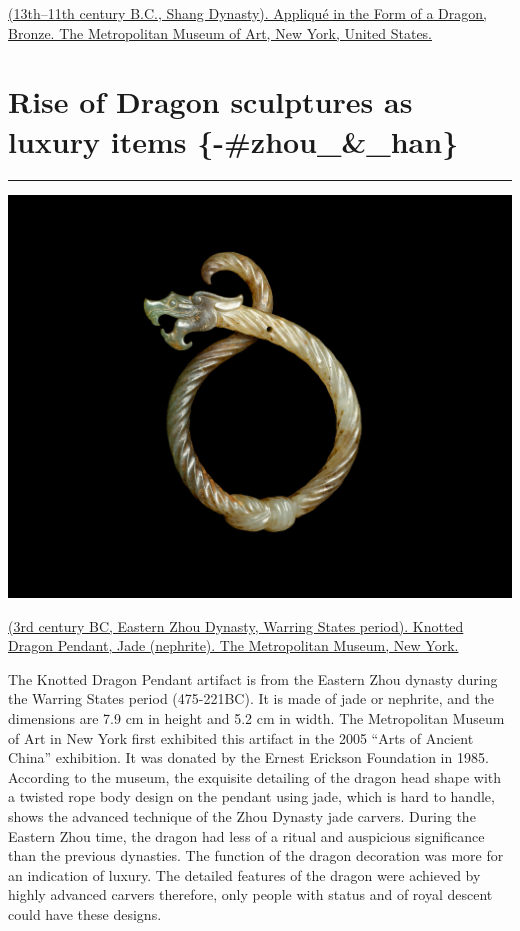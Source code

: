 \documentclass[
]{book}
\begin{document}
\href{https://www.metmuseum.org/art/collection/search/49505}{(13th--11th century B.C., Shang Dynasty). Appliqué in the Form of a Dragon, Bronze. The Metropolitan Museum of Art, New York, United States.}

\hypertarget{rise-of-dragon-sculptures-as-luxury-items--zhou__han}{%
\chapter{Rise of Dragon sculptures as luxury items \{-\#zhou\_\&\_han\}}\label{rise-of-dragon-sculptures-as-luxury-items--zhou__han}}

\begin{center}\rule{0.5\linewidth}{0.5pt}\end{center}

\includegraphics{images/knotted_dragon.jpg}

\href{https://www.metmuseum.org/art/collection/search/39637}{(3rd century BC, Eastern Zhou Dynasty, Warring States period). Knotted Dragon Pendant, Jade (nephrite). The Metropolitan Museum, New York.}

The Knotted Dragon Pendant artifact is from the Eastern Zhou dynasty during the Warring States period (475-221BC). It is made of jade or nephrite, and the dimensions are 7.9 cm in height and 5.2 cm in width. The Metropolitan Museum of Art in New York first exhibited this artifact in the 2005 ``Arts of Ancient China'' exhibition. It was donated by the Ernest Erickson Foundation in 1985. According to the museum, the exquisite detailing of the dragon head shape with a twisted rope body design on the pendant using jade, which is hard to handle, shows the advanced technique of the Zhou Dynasty jade carvers.
During the Eastern Zhou time, the dragon had less of a ritual and auspicious significance than the previous dynasties. The function of the dragon decoration was more for an indication of luxury. The detailed features of the dragon were achieved by highly advanced carvers therefore, only people with status and of royal descent could have these designs.
\end{document}

